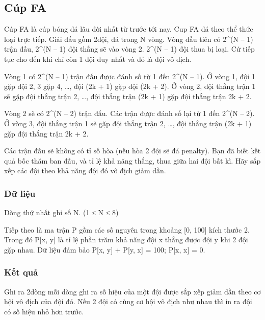 



\subsection{   Cúp FA  }

   Cúp FA là cúp bóng đá lâu đời nhất từ trước tới nay. Cup FA đá theo thể thức loại trực tiếp. Giải đấu gồm 2\textasciicircumN đội, đá trong N vòng. Vòng đầu tiên có 2\textasciicircum(N – 1) trận đấu, 2\textasciicircum(N – 1) đội thắng sẽ vào vòng 2. 2\textasciicircum(N – 1) đội thua bị loại. Cứ tiếp tục cho đến khi chỉ còn 1 đội duy nhất và đó là đội vô địch.  

   Vòng 1 có 2\textasciicircum(N – 1) trận đấu được đánh số từ 1 đến 2\textasciicircum(N – 1). Ở vòng 1, đội 1 gặp đội 2, 3 gặp 4, …, đội (2k + 1) gặp đội (2k + 2). Ở vòng 2, đội thắng trận 1 sẽ gặp đội thắng trận 2, …, đội thắng trận (2k + 1) gặp đội thắng trận 2k + 2.  

   Vòng 2 sẽ có 2\textasciicircum(N – 2) trận đấu. Các trận được đánh số lại từ 1 đến 2\textasciicircum(N – 2). Ở vòng 3, đội thắng trận 1 sẽ gặp đội thắng trận 2, …, đội thắng trận (2k + 1) gặp đội thắng trận 2k + 2.  

   Các trận đấu sẽ không có tỉ số hòa (nếu hòa 2 đội sẽ đá penalty). Bạn đã biết kết quả bốc thăm ban đầu, và tỉ lệ khả năng thắng, thua giữa hai đội bất kì. Hãy sắp xếp các đội theo khả năng đội đó vô địch giảm dần.  

\subsubsection{   Dữ liệu  }

   Dòng thứ nhất ghi số N. (1 ≤ N ≤ 8)  

   Tiếp theo là ma trận P gồm các số nguyên trong khoảng [0, 100] kích thước 2\textasciicircumN. Trong đó P[x, y] là tỉ lệ phần trăm khả năng đội x thắng được đội y khi 2 đội gặp nhau. Dữ liệu đảm bảo P[x, y] + P[y, x] = 100; P[x, x] = 0.  

\subsubsection{   Kết quả  }

   Ghi ra 2\textasciicircumN dòng mỗi dòng ghi ra số hiệu của một đội được sắp xếp giảm dần theo cơ hội vô địch của đội đó. Nếu 2 đội có cùng cơ hội vô địch như nhau thì in ra đội có số hiệu nhỏ hơn trước.  

